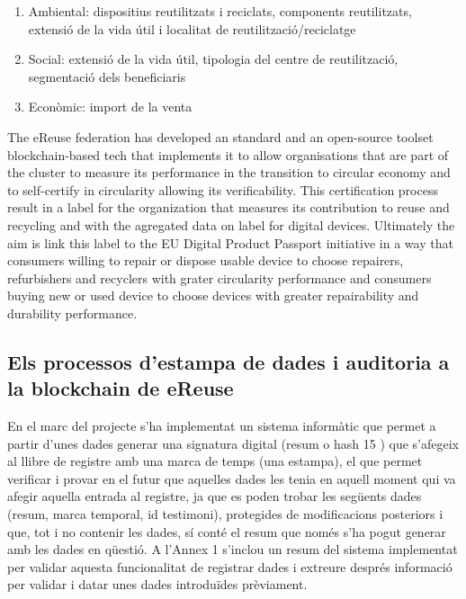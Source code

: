 \documentclass[
]{book}
\begin{document}
\begin{enumerate}
\def\labelenumi{\arabic{enumi}.}
\item
  Ambiental: dispositius reutilitzats i reciclats, components reutilitzats, extensió de la vida útil i localitat de reutilització/reciclatge
\item
  Social: extensió de la vida útil, tipologia del centre de reutilització, segmentació dels beneficiaris
\item
  Econòmic: import de la venta
\end{enumerate}

The eReuse federation has developed an standard and an open-source toolset blockchain-based tech that implements it to allow organisations that are part of the cluster to measure its performance in the transition to circular economy and to self-certify in circularity allowing its verificability. This certification process result in a label for the organization that measures its contribution to reuse and recycling and with the agregated data on label for digital devices. Ultimately the aim is link this label to the EU Digital Product Passport initiative in a way that consumers willing to repair or dispose usable device to choose repairers, refurbishers and recyclers with grater circularity performance and consumers buying new or used device to choose devices with greater repairability and durability performance.

\hypertarget{els-processos-destampa-de-dades-i-auditoria-a-la-blockchain-de-ereuse}{%
\subsection{Els processos d'estampa de dades i auditoria a la blockchain de eReuse}\label{els-processos-destampa-de-dades-i-auditoria-a-la-blockchain-de-ereuse}}

En el marc del projecte s'ha implementat un sistema informàtic que permet a partir d'unes dades generar una signatura digital (resum o hash 15 ) que s'afegeix al llibre de registre amb una marca de temps (una estampa), el que permet verificar i provar en el futur que aquelles dades les tenia en aquell moment qui va afegir aquella entrada al registre, ja que es poden trobar les següents dades (resum, marca temporal, id testimoni), protegides de modificacions posteriors i que, tot i no contenir les dades, sí conté el resum que només s'ha pogut generar amb les dades en qüestió. A l'Annex 1 s'inclou un resum del sistema implementat per validar aquesta
funcionalitat de registrar dades i extreure després informació per validar i datar unes dades introduïdes prèviament.
\end{document}
